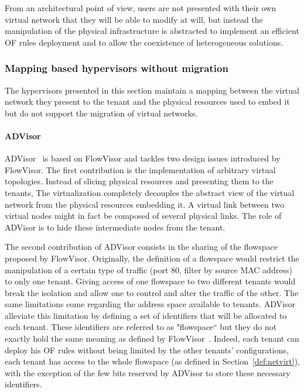 From an architectural point of view, users are not presented with their own virtual network that they will be able to modify at will, but instead the manipulation of the physical infrastructure is abstracted to implement an efficient OF rules deployment and to allow the coexistence of heterogeneous solutions.


\subsubsection{Mapping based hypervisors without migration}
The hypervisors presented in this section maintain a mapping between the virtual network they present to the tenant and the physical resources used to embed it but do not support the migration of virtual networks.

\paragraph{ADVisor}
ADVisor~\cite{ADVisor-Salvadori2012} is based on FlowVisor and tackles two design issues introduced by FlowVisor.
The first contribution is the implementation of arbitrary virtual topologies.
Instead of slicing physical resources and presenting them to the tenants, 
The virtualization completely decouples the abstract view of the virtual network from the physical resources embedding it.
A virtual link between two virtual nodes might in fact be composed of several physical links. The role of ADVisor is to hide these intermediate nodes from the tenant.

The second contribution of ADVisor consists in the sharing of the flowspace proposed by FlowVisor.
Originally, the definition of a flowspace would restrict the manipulation of a certain type of traffic (\eg port 80, filter by source MAC address) to only one tenant.
Giving access of one flowspace to two different tenants would break the isolation and allow one to control and alter the traffic of the other.
The same limitations come regarding the address space available to tenants.
ADVisor alleviate this limitation by defining a set of identifiers that will be allocated to each tenant. These identifiers are referred to as "flowspace`` but they do not exactly hold the same meaning as defined by FlowVisor~\cite{FlowVisor-Sherwood2009}. Indeed, each tenant can deploy his OF rules without being limited by the other tenants' configurations, \ie each tenant has access to the whole flowspace (as defined in Section~\ref{def:netvirt}), with the exception of the few bits reserved by ADVisor to store these necessary identifiers.

